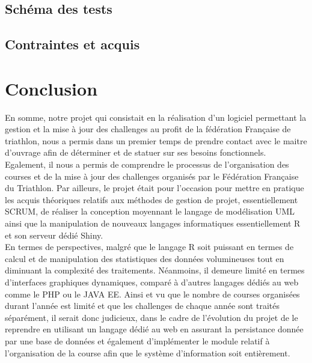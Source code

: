 \documentclass[12pt,a4paper]{report}
\begin{document}
\subsection {Schéma des tests }

\subsection {Contraintes et acquis }
\newpage
\section* {Conclusion}

En somme, notre projet qui consistait en la réalisation d’un logiciel permettant  la gestion et la mise à jour des challenges au profit de la fédération Française de triathlon, nous a permis dans un premier temps de prendre contact avec le maitre d’ouvrage afin de  déterminer et de statuer sur ses besoins fonctionnels. Egalement, il nous a permis de comprendre le processus de l’organisation des courses et de la mise à jour des challenges organisés par le Fédération Française du Triathlon. Par ailleurs, le projet était pour l’occasion pour mettre en pratique les acquis théoriques relatifs aux méthodes de gestion de projet, essentiellement SCRUM, de réaliser la conception moyennant le langage de modélisation UML ainsi   que la manipulation de nouveaux langages informatiques essentiellement R et son serveur dédié Shiny.\\
En termes de perspectives, malgré que le langage R soit puissant en termes de calcul et de manipulation des statistiques des données volumineuses tout en diminuant la complexité des traitements. Néanmoins, il demeure limité en termes d’interfaces graphiques dynamiques, comparé à d’autres langages dédiés au web comme le PHP ou le JAVA EE. Ainsi et vu que le nombre de courses organisées durant l’année est limité et que les challenges de chaque année sont traités séparément, il serait donc judicieux, dans le cadre de l’évolution du projet de le reprendre en utilisant un langage dédié au web en assurant la persistance donnée par une base de données et également d’implémenter le module relatif à l’organisation de la course afin que le système d’information soit entièrement.

\newpage


	
	
\end{document}
